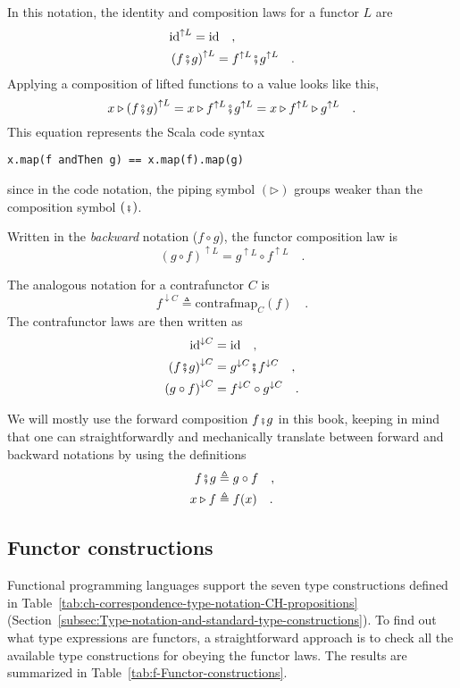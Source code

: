 In this notation, the identity and composition laws for a functor
$L$ are 
\begin{align*}
 & \text{id}^{\uparrow L}=\text{id}\quad,\\
 & \left(f\bef g\right)^{\uparrow L}=f^{\uparrow L}\bef g^{\uparrow L}\quad.
\end{align*}
Applying a composition of lifted functions to a value looks like this,
\[
x\triangleright\left(f\bef g\right)^{\uparrow L}=x\triangleright f^{\uparrow L}\bef g^{\uparrow L}=x\triangleright f^{\uparrow L}\triangleright g^{\uparrow L}\quad.
\]
This equation represents the Scala code syntax
\begin{lstlisting}
x.map(f andThen g) == x.map(f).map(g)
\end{lstlisting}
since in the code notation, the piping symbol $\left(\triangleright\right)$
groups weaker than the composition symbol $\left(\bef\right)$.

Written in the \emph{backward} notation ($f\circ g$), the functor
composition law is
\[
\left(g\circ f\right)^{\uparrow L}=g^{\uparrow L}\circ f^{\uparrow L}\quad.
\]

The analogous notation for a contrafunctor $C$ is
\[
f^{\downarrow C}\triangleq\text{contrafmap}_{C}(f)\quad.
\]
The contrafunctor laws are then written as
\begin{align*}
\text{id}^{\downarrow C} & =\text{id}\quad,\\
\left(f\bef g\right)^{\downarrow C} & =g^{\downarrow C}\bef f^{\downarrow C}\quad,\\
\left(g\circ f\right)^{\downarrow C} & =f^{\downarrow C}\circ g^{\downarrow C}\quad.
\end{align*}

We will mostly use the forward composition $f\bef g$ in this book,
keeping in mind that one can straightforwardly and mechanically translate
between forward and backward notations by using the definitions 
\begin{align*}
f\bef g & \triangleq g\circ f\quad,\\
x\triangleright f & \triangleq f(x)\quad.
\end{align*}


\subsection{Functor constructions}

Functional programming languages support the seven type constructions
defined in Table~\ref{tab:ch-correspondence-type-notation-CH-propositions}
(Section~\ref{subsec:Type-notation-and-standard-type-constructions}).
To find out what type expressions are functors, a straightforward
approach is to check all the available type constructions for obeying
the functor laws. The results are summarized in Table~\ref{tab:f-Functor-constructions}. 

